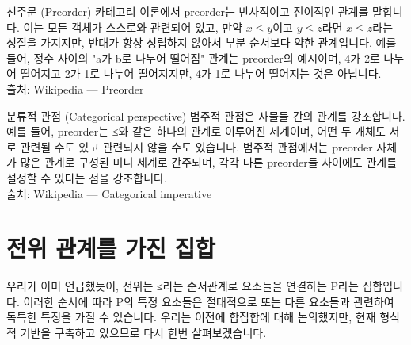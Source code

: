 \documentclass[11pt, a4paper, twoside, openany]{book}
\begin{document}
\begin{deepresearch}{선주문 (Preorder)}
카테고리 이론에서 preorder\hspace{0pt}는 반사적이고 전이적인 관계를 말합니다.  이는 모든 객체가 스스로와 관련되어 있고, 만약 $x \le y$이고 $y \le z$라면 $x \le z$라는 성질을 가지지만, 반대가 항상 성립하지 않아서 부분 순서보다 약한 관계입니다. 예를 들어, 정수 사이의 "a\hspace{0pt}가 b\hspace{0pt}로 나누어 떨어짐" 관계는 preorder\hspace{0pt}의 예시이며, 4\hspace{0pt}가 2\hspace{0pt}로 나누어 떨어지고 2\hspace{0pt}가 1\hspace{0pt}로 나누어 떨어지지만, 4\hspace{0pt}가 1\hspace{0pt}로 나누어 떨어지는 것은 아닙니다.
\\[4pt]{\footnotesize\color{ctgray} 출처: Wikipedia — Preorder}
\end{deepresearch}

\begin{deepresearch}{분류적 관점 (Categorical perspective)}
범주적 관점은 사물들 간의 관계를 강조합니다. 예를 들어, preorder\hspace{0pt}는 ≤와 같은 하나의 관계로 이루어진 세계이며, 어떤 두 개체도 서로 관련될 수도 있고 관련되지 않을 수도 있습니다. 범주적 관점에서는 preorder 자체가 많은 관계로 구성된 미니 세계로 간주되며, 각각 다른 preorder\hspace{0pt}들 사이에도 관계를 설정할 수 있다는 점을 강조합니다.
\\[4pt]{\footnotesize\color{ctgray} 출처: Wikipedia — Categorical imperative}
\end{deepresearch}


\section{\textbf{전위 관계를 가진 집합}}
\label{sec:1-3}

우리가 이미 언급했듯이, 전위는 ≤라는 순서관계로 요소들을 연결하는 P\hspace{0pt}라는 집합입니다. 
이러한 순서에 따라 P\hspace{0pt}의 특정 요소들은 절대적으로 또는 다른 요소들과 관련하여 독특한 특징을 가질 수 있습니다. 우리는 이전에 합집합에 대해 논의했지만, 현재 형식적 기반을 구축하고 있으므로 다시 한번 살펴보겠습니다.
\end{document}
